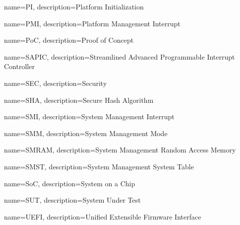  {
	name=PI,
	description={Platform Initialization
	}
}

 {
	name=PMI,
	description={Platform Management Interrupt
	}
}

 {
	name=PoC,
	description={Proof of Concept
	}
}

 {
	name=SAPIC,
	description={Streamlined Advanced Programmable Interrupt Controller
	}
}

 {
	name=SEC,
	description={Security
	}
}

 {
	name=SHA,
	description={Secure Hash Algorithm
	}
}

 {
	name=SMI,
	description={System Management Interrupt
	}
}

 {
	name=SMM,
	description={System Management Mode
	}
}


 {
	name=SMRAM,
	description={System Management Random Access Memory
	}
}


 {
	name=SMST,
	description={System Management System Table
	}
}

 {
	name=SoC,
	description={System on a Chip
	}
}


 {
	name=SUT,
	description={System Under Test
	}
}

 {
	name=UEFI,
	description={Unified Extensible Firmware Interface
	}
}
